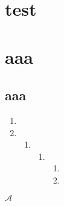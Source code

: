 \documentclass{ctexart}
\begin{document}
\chapter{test}
\chapter{aaa}
\section{aaa}
\begin{enumerate}
	\item
	\item
	      \begin{enumerate}
		      \item
		            \begin{enumerate}
			            \item
			                  \begin{enumerate}
				                  \item
				                  \item
			                  \end{enumerate}
		            \end{enumerate}
	      \end{enumerate}
\end{enumerate}
\(\mathcal{A}\)
\end{document}
